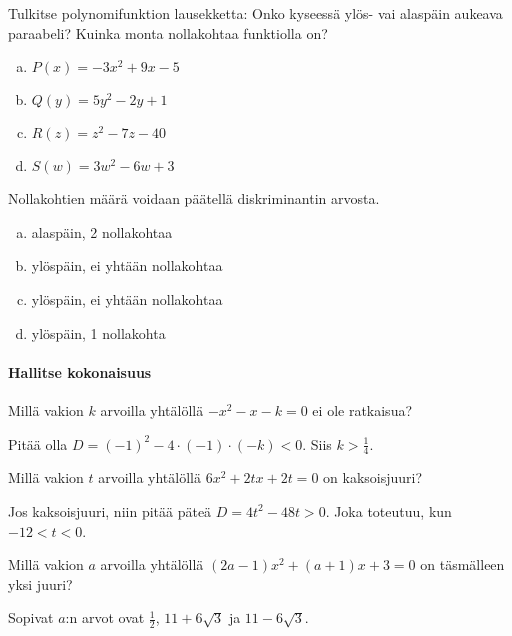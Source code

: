 \begin{tehtavasivu}
\begin{tehtava}
	Tulkitse polynomifunktion lausekketta: Onko kyseessä ylös- vai alaspäin aukeava paraabeli?
	Kuinka monta nollakohtaa funktiolla on?
	\begin{enumerate}[a)]
		\item $P(x)=-3x^2+9x-5$
		\item $Q(y)=5y^2-2y+1$
		\item $R(z)=z^2-7z-40$
		\item $S(w)=3w^2-6w+3$
	\end{enumerate}
	\begin{vastaus}
	Nollakohtien määrä voidaan päätellä diskriminantin arvosta.
		\begin{enumerate}[a)]
			\item alaspäin, 2 nollakohtaa
			\item ylöspäin, ei yhtään nollakohtaa
			\item ylöspäin, ei yhtään nollakohtaa
			\item ylöspäin, 1 nollakohta
		\end{enumerate}

	\end{vastaus}


\end{tehtava}



\paragraph*{Hallitse kokonaisuus}

\begin{tehtava}
	Millä vakion $k$ arvoilla yhtälöllä $-x^2-x-k = 0$ ei ole ratkaisua?
	\begin{vastaus}
		Pitää olla $D=(-1)^2-4 \cdot (-1) \cdot (-k)<0$. Siis $k>\frac{1}{4}$.
	\end{vastaus}
\end{tehtava}

\begin{tehtava}
	Millä vakion $t$ arvoilla yhtälöllä $6x^2+2tx+2t=0$ on kaksoisjuuri?
	\begin{vastaus}
		Jos kaksoisjuuri, niin pitää päteä $D=4t^2-48t>0$. Joka toteutuu, kun $-12 < t < 0$.
	\end{vastaus}
\end{tehtava}

\begin{tehtava}
	Millä vakion $a$ arvoilla yhtälöllä $(2a-1)x^2+(a+1)x+3=0$ on täsmälleen yksi juuri?
	\begin{vastaus}
		Sopivat $a$:n arvot ovat $\frac{1}{2}$, $11+6\sqrt{3}$ ja $11-6\sqrt{3}$.
	\end{vastaus}
\end{tehtava}


\end{tehtavasivu}
